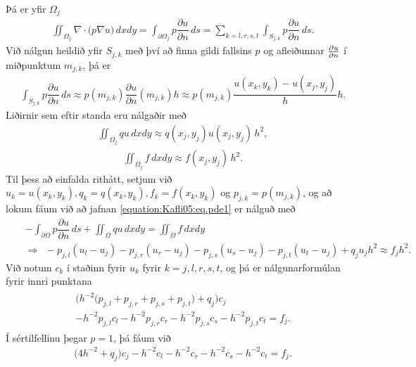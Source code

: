 \documentclass[a4paper,10pt,icelandic]{sphinxmanual}
\begin{document}
Þá er yfir \(\Omega_j\)
\begin{equation*}
\begin{split}\iint_{\Omega_j} \nabla\cdot\big(p\nabla u\big) \, dxdy
=\int_{\partial{\Omega}_j} p\dfrac{\partial u}{\partial n}\, ds =
\sum_{k=l,r,s,t} \int_{S_{j,k}} p\dfrac{\partial u}{\partial n}\, ds.\end{split}
\end{equation*}
Við nálgun heildið yfir \(S_{j,k}\) með því að finna gildi fallsins \(p\) og afleiðunnar \({\partial u\over \partial n}\) í miðpunktum \(m_{j,k}\), þá er
\begin{equation*}
\begin{split}\int_{S_{j,k}}p\dfrac{\partial u}{\partial n} \, ds
\approx p(m_{j,k})\dfrac{\partial u}{\partial n}(m_{j,k}) h
\approx p(m_{j,k})\dfrac{u(x_k,y_k)-u(x_j,y_j)}{h} h.\end{split}
\end{equation*}
Liðirnir sem eftir standa eru nálgaðir með
\begin{equation*}
\begin{split}\iint_{\Omega_j}q u \, dxdy \approx q(x_j,y_j)u(x_j,y_j)\,  h^2,\end{split}
\end{equation*}\begin{equation*}
\begin{split}\iint_{\Omega_j}f \, dxdy \approx f(x_j,y_j)\,  h^2.\end{split}
\end{equation*}
Til þess að einfalda rithátt, setjum við \(u_k=u(x_k,y_k), q_k=q(x_k,y_k), f_k=f(x_k,y_k)\) og \(p_{j,k}=p(m_{j,k})\), og að lokum fáum við að jafnan \eqref{equation:Kafli05:eq.pde1} er nálguð með
\begin{equation*}
\begin{split}&&-\int_{\partial\Omega } p\dfrac{\partial u}{\partial n}\, ds
+\iint_\Omega qu\, dxdy =\iint_\Omega f\, dxdy\\
&&
\Rightarrow ~~
-p_{j,l}(u_l-u_j)
-p_{j,r}(u_r-u_j)
-p_{j,s}(u_s-u_j)
-p_{j,t}(u_t-u_j)
+q_ju_jh^2\approx f_jh^2.\end{split}
\end{equation*}
Við notum \(c_k\) í staðinn fyrir \(u_k\) fyrir \(k=j,l,r,s,t\), og þá er nálgunarformúlan fyrir innri punktana
\begin{equation}\label{equation:Kafli05:eq.approx1}
\begin{split}\begin{gathered}
\big(h^{-2}\big({p_{j,l}+p_{j,r}+p_{j,s}+p_{j,t}}\big)+q_j\big)c_j
\\
-h^{-2}p_{j,l}c_l
-h^{-2}p_{j,r}c_r
-h^{-2}p_{j,s}c_s
-h^{-2}p_{j,t}c_t
=f_j.
\end{gathered}\end{split}
\end{equation}
Í sértilfellinu þegar \(p=1\), þá fáum við
\begin{equation}\label{equation:Kafli05:eq.approx1s}
\begin{split}\big(4{h^{-2}}+q_j\big)c_j
-{h^{-2}}c_l
-{h^{-2}}c_r
-{h^{-2}}c_s
-{h^{-2}}c_t
=f_j.\end{split}
\end{equation}
\end{document}
